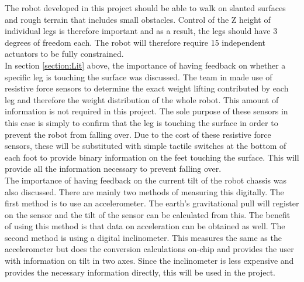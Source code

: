 The robot developed in this project should be able to walk on slanted surfaces and rough terrain that includes small obstacles. Control of the Z height of individual legs is therefore important and as a result, the legs should have 3 degrees of freedom each. The robot will therefore require 15 independent actuators to be fully constrained.\\

In section \ref{section:Lit} above, the importance of having feedback on whether a specific leg is touching the surface was discussed. The team in \cite{Ollervides:Navigation} made use of resistive force sensors to determine the exact weight lifting contributed by each leg and therefore the weight distribution of the whole robot. This amount of information is not required in this project. The sole purpose of these sensors in this case is simply to confirm that the leg is touching the surface in order to prevent the robot from falling over. Due to the cost of these resistive force sensors, these will be substituted with simple tactile switches at the bottom of each foot to provide binary information on the feet touching the surface. This will provide all the information necessary to prevent falling over.\\

The importance of having feedback on the current tilt of the robot chassis was also discussed. There are mainly two methods of measuring this digitally. The first method is to use an accelerometer. The earth's gravitational pull will register on the sensor and the tilt of the sensor can be calculated from this. The benefit of using this method is that data on acceleration can be obtained as well. The second method is using a digital inclinometer. This measures the same as the accelerometer but does the conversion calculations on-chip and provides the user with information on tilt in two axes. Since the inclinometer is less expensive and provides the necessary information directly, this will be used in the project.

\newpage

